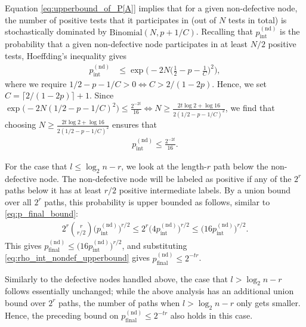 Equation \eqref{eq:upperbound_of_P[A]} implies that for a given non-defective node, the number of positive tests that it participates in (out of $N$ tests in total) is stochastically dominated by $\text{Binomial}(N,p+1/C)$. Recalling that $p_{\text{int}}^{(\text{nd})}$ is the probability that a given non-defective node participates in at least $N/2$ positive tests, Hoeffding's inequality gives
\begin{align}
    p_{\text{int}}^{(\text{nd})}&\leq\exp\bigg(-2N\Big(\frac{1}{2}-p-\frac{1}{C}\Big)^2\bigg), \label{eq:rho_int_nondef_upperbound0}
\end{align}
where we require $1/2-p-1/C>0\Leftrightarrow C>2/(1-2p)$. Hence, we set $C=\lceil2/(1-2p)\rceil+1$. Since $\exp\big(-2N(1/2-p-1/C)^2\big)\leq \frac{2^{-2t}}{16} \Leftrightarrow N\geq \frac{2t\log2+\log16}{2(1/2-p-1/C)^2}$, we find that choosing $N\geq \frac{2t\log2+\log16}{2(1/2-p-1/C)^2}$ ensures that
\begin{align}
    p_{\text{int}}^{(\text{nd})}\leq\frac{2^{-2t}}{16}. \label{eq:rho_int_nondef_upperbound}
\end{align}

For the case that $l\leq\log_2n-r$, we look at the length-$r$ path below the non-defective node. The non-defective node will be labeled as positive if any of the $2^r$ paths below it has at least $r/2$ positive intermediate labels. By a union bound over all $2^r$ paths, this probability is upper bounded as follows, similar to \eqref{eq:p_final_bound}:
\begin{align}
    2^r{r\choose r/2}\big(p_{\text{int}}^{(\text{nd})}\big)^{r/2}
    \leq2^r\big(4p_{\text{int}}^{(\text{nd})}\big)^{r/2}
    \leq\big(16p_{\text{int}}^{(\text{nd})}\big)^{r/2}.
\end{align}
This gives $p_{\text{final}}^{(\text{nd})}\leq\big(16p_{\text{int}}^{(\text{nd})}\big)^{r/2}$, and substituting \eqref{eq:rho_int_nondef_upperbound} gives $p_{\text{final}}^{(\text{nd})}\leq2^{-tr}$.

Similarly to the defective nodes handled above, the case that $l>\log_2n-r$ follows essentially unchanged; while the above analysis has an additional union bound over $2^r$ paths, the number of paths when $l > \log_2n - r$ only gets smaller.  Hence, the preceding bound on $p_{\text{final}}^{(\text{nd})}\leq2^{-tr}$ also holds in this case.


